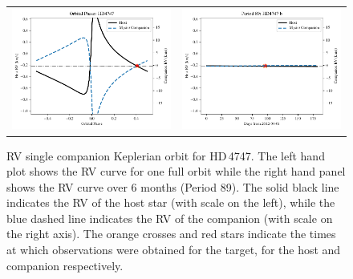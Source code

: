 
\begin{figure}
    \centering
    \begin{tabular}{cc}
        \includegraphics[width=0.45\linewidth]{figures/direct-recovery/orbital-plots/HD4747_orbital_phase.pdf} & \includegraphics[width=0.45\linewidth]{figures/direct-recovery/orbital-plots/HD4747_p89.pdf}\\
    \end{tabular}
    \caption[]{{RV} single companion Keplerian orbit for {HD\,4747}.
        The left hand plot shows the {RV} curve for one full orbit while the right hand panel shows the {RV} curve over 6 months (Period 89).
        The solid black line indicates the {RV} of the host star (with scale on the left), while the blue dashed line indicates the {RV} of the companion (with scale on the right axis).
        The orange crosses and red stars indicate the times at which observations were obtained for the target, for the host and companion respectively.}
    \label{fig:hd4747p89}
\end{figure}

